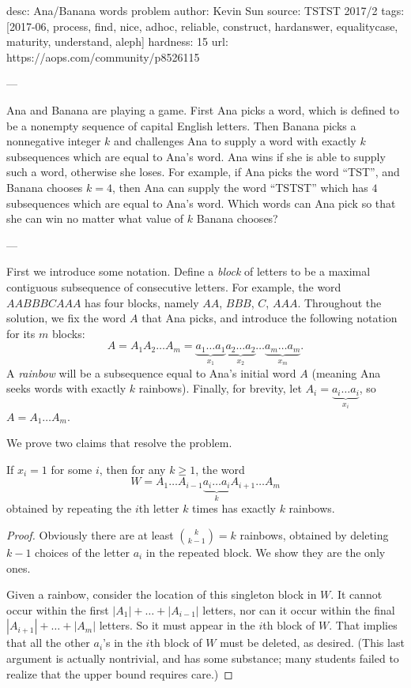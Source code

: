 desc: Ana/Banana words problem
author: Kevin Sun
source: TSTST 2017/2
tags: [2017-06, process, find, nice, adhoc, reliable, construct, hardanswer, equalitycase, maturity, understand, aleph]
hardness: 15
url: https://aops.com/community/p8526115

---

Ana and Banana are playing a game. First Ana picks a word,
which is defined to be a nonempty sequence of capital English letters.
Then Banana picks a nonnegative integer $k$ and challenges Ana
to supply a word with exactly $k$ subsequences which are equal to Ana's word.
Ana wins if she is able to supply such a word, otherwise she loses.
For example, if Ana picks the word ``TST'', and Banana chooses $k = 4$,
then Ana can supply the word ``TSTST'' which has $4$ subsequences
which are equal to Ana's word.
Which words can Ana pick so that she can win no matter what value of
$k$ Banana chooses?

---

First we introduce some notation.
Define a \emph{block} of letters to be a maximal
contiguous subsequence of consecutive letters.
For example, the word $AABBBCAAA$ has four blocks, namely $AA$, $BBB$, $C$, $AAA$.
Throughout the solution, we fix the word $A$ that Ana picks,
and introduce the following notation for its $m$ blocks:
\[ A =
  A_1 A_2 \dots A_m
  = \underbrace{a_1 \dots a_1}_{x_1}
  \underbrace{a_2 \dots a_2}_{x_2}
  \dots
  \underbrace{a_m \dots a_m}_{x_m}.
\]
A \emph{rainbow} will be a subsequence equal to Ana's initial word $A$
(meaning Ana seeks words with exactly $k$ rainbows).
Finally, for brevity, let $A_i = \underbrace{a_i \dots a_i}_{x_i}$,
so $A = A_1 \dots A_m$.

We prove two claims that resolve the problem.
\begin{claim*}
  If $x_i = 1$ for some $i$, then for any $k \ge 1$, the word
  \[ W = A_1 \dots A_{i-1} \underbrace{a_i \dots a_i}_{k}
    A_{i+1} \dots A_m  \]
  obtained by repeating the $i$th letter $k$ times
  has exactly $k$ rainbows.
\end{claim*}
\begin{proof}
  Obviously there are at least $\binom{k}{k-1}=k$ rainbows,
  obtained by deleting $k-1$ choices of the letter $a_i$
  in the repeated block.
  We show they are the only ones.

  Given a rainbow, consider the location of this singleton block in $W$.
  It cannot occur within the first $|A_1| + \dots + |A_{i-1}|$ letters,
  nor can it occur within the final $|A_{i+1}| + \dots + |A_m|$ letters.
  So it must appear in the $i$th block of $W$.
  That implies that all the other $a_i$'s in the
  $i$th block of $W$ must be deleted, as desired.
  (This last argument is actually nontrivial, and has some substance;
  many students failed to realize that the upper bound requires care.)
\end{proof}


